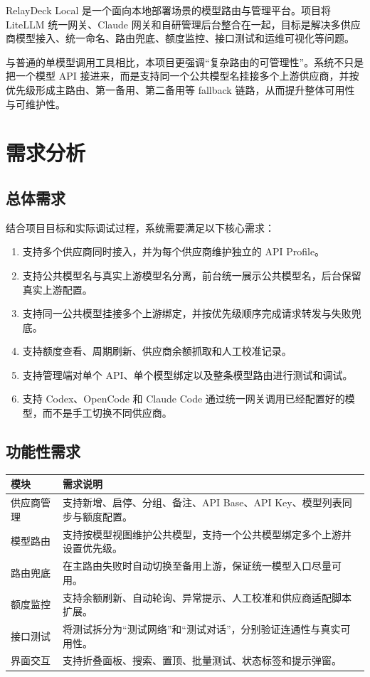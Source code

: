 \documentclass[12pt,a4paper]{ctexart}
\begin{document}
RelayDeck Local 是一个面向本地部署场景的模型路由与管理平台。项目将 LiteLLM 统一网关、Claude 网关和自研管理后台整合在一起，目标是解决多供应商模型接入、统一命名、路由兜底、额度监控、接口测试和运维可视化等问题。

与普通的单模型调用工具相比，本项目更强调“复杂路由的可管理性”。系统不只是把一个模型 API 接进来，而是支持同一个公共模型名挂接多个上游供应商，并按优先级形成主路由、第一备用、第二备用等 fallback 链路，从而提升整体可用性与可维护性。

\section{需求分析}

\subsection{总体需求}

结合项目目标和实际调试过程，系统需要满足以下核心需求：

\begin{enumerate}[label=\arabic*.]
  \item 支持多个供应商同时接入，并为每个供应商维护独立的 API Profile。
  \item 支持公共模型名与真实上游模型名分离，前台统一展示公共模型名，后台保留真实上游配置。
  \item 支持同一公共模型挂接多个上游绑定，并按优先级顺序完成请求转发与失败兜底。
  \item 支持额度查看、周期刷新、供应商余额抓取和人工校准记录。
  \item 支持管理端对单个 API、单个模型绑定以及整条模型路由进行测试和调试。
  \item 支持 Codex、OpenCode 和 Claude Code 通过统一网关调用已经配置好的模型，而不是手工切换不同供应商。
\end{enumerate}

\subsection{功能性需求}

\begin{longtable}{p{3.2cm}p{10.2cm}}
\toprule
模块 & 需求说明 \\
\midrule
\endhead
供应商管理 & 支持新增、启停、分组、备注、API Base、API Key、模型列表同步与额度配置。 \\
模型路由 & 支持按模型视图维护公共模型，支持一个公共模型绑定多个上游并设置优先级。 \\
路由兜底 & 在主路由失败时自动切换至备用上游，保证统一模型入口尽量可用。 \\
额度监控 & 支持余额刷新、自动轮询、异常提示、人工校准和供应商适配脚本扩展。 \\
接口测试 & 将测试拆分为“测试网络”和“测试对话”，分别验证连通性与真实可用性。 \\
界面交互 & 支持折叠面板、搜索、置顶、批量测试、状态标签和提示弹窗。 \\
\bottomrule
\end{longtable}
\end{document}
